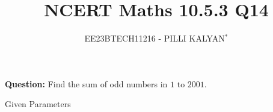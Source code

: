 \documentclass[beamer]{IEEEtran}
\theoremstyle{remark}
\begin{document}

\vspace{3cm}
	\title{NCERT Maths 10.5.3 Q14}
	\author{EE23BTECH11216 - PILLI KALYAN$^{*}$%
	}
\maketitle
\newpage
\bigskip

\renewcommand{\thefigure}{\theenumi}
\renewcommand{\thetable}{\theenumi}

\vspace{3cm}
\maketitle
\textbf{Question:} 
Find the sum of odd numbers in $1$ to $2001$.

\solution

\begin{table}
	\centering
	
	 	
	 	\caption{Given Parameters}
	 	\label{tab:11.9.2.1.1}
 \end{table}
\end{document}
